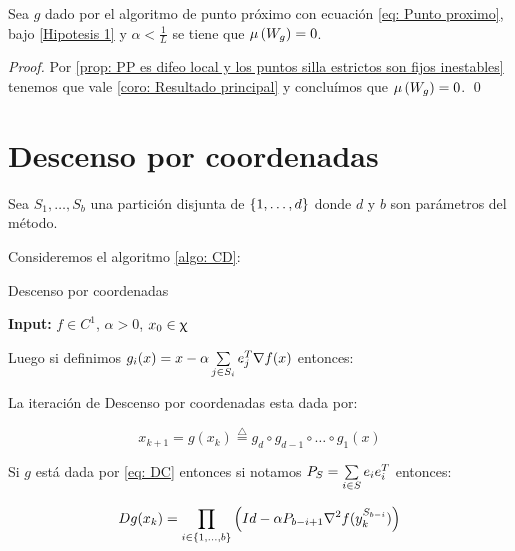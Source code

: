 \begin{corollary}
	\label{coro: PP converge a minimos}
	Sea $g$ dado por el algoritmo de punto pr\'oximo con ecuaci\'on \ref{eq: Punto proximo}, bajo \ref{Hipotesis 1} y $\alpha < \frac{1}{L}$ se tiene que $\mu\left(W_g\right) = 0$.
\end{corollary}

\begin{proof}
	Por \ref{prop: PP es difeo local y los puntos silla estrictos son fijos inestables} tenemos que vale \ref{coro: Resultado principal} y conclu\'imos que $\mu \left(W_g\right) = 0$. \qed
\end{proof}

\section{Descenso por coordenadas}

Sea $S_1, \dots, S_b$ una partici\'on disjunta de $\left\lbrace1, \dots, d\right\rbrace$ donde $d$ y $b$ son par\'ametros del m\'etodo. 

Consideremos el algoritmo \ref{algo: CD}:

\LinesNumbered
\begin{algorithm}[H]
	\caption{Descenso por coordenadas\label{algo: CD}}
	\textbf{Input:} $f \in C^1$, $\alpha >0$, $x_0 \in \upchi$ \\
\end{algorithm}

Luego si definimos $g_i(x) = x - \alpha \sum\limits_{j \in S_i}{e_j^T \nabla f(x)}$ entonces:

\begin{lemma}
	La iteraci\'on de Descenso por coordenadas esta dada por:
	
	\begin{equation}
		\label{eq: DC}
		x_{k+1} = g(x_k) \stackrel{\triangle}{=} g_d \circ g_{d-1} \circ \dots \circ g_1(x)
	\end{equation}
	
\end{lemma}

\begin{lemma}
	Si $g$ est\'a dada por \ref{eq: DC} entonces si notamos $P_S = \sum\limits_{i \in S}{e_ie_i^T}$ entonces:
	
	\begin{equation}
	\label{eq: Diferencial de DC}
	Dg(x_{k}) = \prod\limits_{i \in \left\lbrace1, \dots, b\right\rbrace}{\left(Id - \alpha P_{b-i+1}\nabla ^2 f(y_{k}^{S_{b-i}})\right)}
	\end{equation}
	
\end{lemma}

